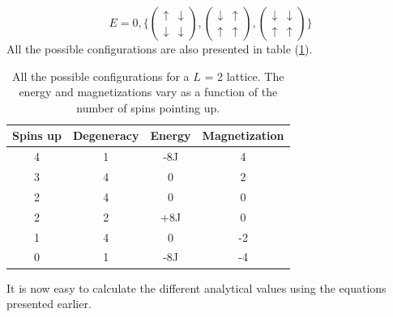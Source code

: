 \documentclass[10pt,a4paper,titlepage]{article}
\begin{document}
\begin{equation}
E = 0, \bigg\{
\begin{pmatrix}
    \uparrow & \downarrow \\
    \downarrow & \downarrow
  \end{pmatrix},
  \begin{pmatrix}
    \downarrow & \uparrow \\
    \uparrow & \uparrow
  \end{pmatrix},
  \begin{pmatrix}
    \downarrow & \downarrow \\
    \uparrow & \uparrow
  \end{pmatrix}
   \bigg\}
\end{equation}
All the possible configurations are also presented in table (\ref{tab:conf}).
\begin{table}[!ht]
\centering
\caption{All the possible configurations for a $L$ = 2 lattice. The energy and magnetizations vary as a function of the number of spins pointing up. } \label{tab:conf}
\begin{tabular}{| c | c | c | c |} \hline
\textbf{Spins up} & \textbf{Degeneracy} & \textbf{Energy} & \textbf{Magnetization} \\ \hline
4 & 1 & -8J & 4 \\ \hline
3 & 4 & 0 & 2 \\ \hline
2 & 4 & 0 & 0 \\ \hline
2 & 2 & +8J & 0 \\ \hline
1 & 4 & 0 & -2 \\ \hline
0 & 1 & -8J & -4 \\ \hline
\end{tabular}
\end{table}
It is now easy to calculate the different analytical values using the equations presented earlier. 
\end{document}
